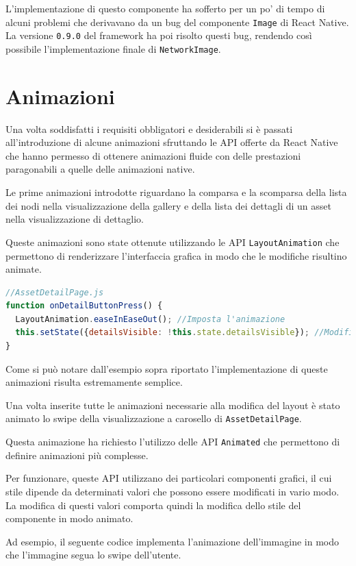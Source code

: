 L'implementazione di questo componente ha sofferto per un po' di tempo di alcuni problemi che derivavano da un bug del componente \texttt{Image} di React Native.
La versione \texttt{0.9.0} del framework ha poi risolto questi bug, rendendo così possibile l'implementazione finale di \texttt{NetworkImage}.


\section{Animazioni}

Una volta soddisfatti i requisiti obbligatori e desiderabili si è passati all'introduzione di alcune animazioni sfruttando le API offerte da React Native che hanno permesso di ottenere animazioni fluide con delle prestazioni paragonabili a quelle delle animazioni native.

Le prime animazioni introdotte riguardano la comparsa e la scomparsa della lista dei nodi nella visualizzazione della gallery e della lista dei dettagli di un asset nella visualizzazione di dettaglio.

Queste animazioni sono state ottenute utilizzando le API \texttt{LayoutAnimation} che permettono di renderizzare l'interfaccia grafica in modo che le modifiche risultino animate.
\begin{lstlisting}[language=JavaScript, caption=AssetDetailPage - Animazione della comparsa/scomparsa lista dei dettagli]
//AssetDetailPage.js
function onDetailButtonPress() {
  LayoutAnimation.easeInEaseOut(); //Imposta l'animazione
  this.setState({detailsVisible: !this.state.detailsVisible}); //Modifica lo stato del componente causandone il re-rendering
}
\end{lstlisting}
Come si può notare dall'esempio sopra riportato l'implementazione di queste animazioni risulta estremamente semplice.

Una volta inserite tutte le animazioni necessarie alla modifica del layout è stato animato lo swipe della visualizzazione a carosello di \texttt{AssetDetailPage}.

Questa animazione ha richiesto l'utilizzo delle API \texttt{Animated} che permettono di definire animazioni più complesse.

Per funzionare, queste API utilizzano dei particolari componenti grafici, il cui stile dipende da determinati valori che possono essere modificati in vario modo. La modifica di questi valori comporta quindi la modifica dello stile del componente in modo animato.

Ad esempio, il seguente codice implementa l'animazione dell'immagine in modo che l'immagine segua lo swipe dell'utente.

